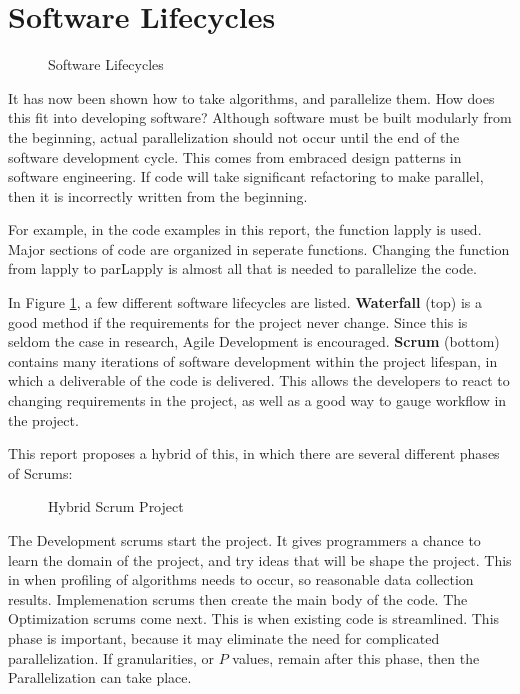 
\section{Software Lifecycles}

\begin{figure}[h]
	\begin{center}
		\caption{Software Lifecycles} 
		\label{lifecycles}
	\end{center}
\end{figure}

It has now been shown how to take algorithms, and parallelize them. How does this fit into developing software?
Although software must be built modularly from the beginning, actual parallelization should not occur until the 
end of the software development cycle. This comes from embraced design patterns in software engineering.
If code will take significant refactoring to make parallel, then it is incorrectly written from the beginning.

For example, in the code examples in this report, the function lapply is used. Major sections of code are organized in seperate functions. Changing the function from lapply to parLapply is almost all that is needed
to parallelize the code. 

In Figure \ref{lifecycles}, a few different software lifecycles are listed. \textbf{Waterfall} (top) is a good method if
the requirements for the project never change. Since this is seldom the case in research, Agile 
Development is encouraged. \textbf{Scrum} (bottom) contains many iterations of software development within
the project lifespan, in which a deliverable of the code is delivered. This allows the developers to react to 
changing requirements in the project, as well as a good way to gauge workflow in the project.

This report proposes a hybrid of this, in which there are several different phases of Scrums:

\begin{figure}[h]
	\begin{center}
		\caption{Hybrid Scrum Project} 
		\label{hybrid_scrums}
	\end{center}
\end{figure}

The Development scrums start the project. It gives programmers a chance to learn the domain of the project, and try ideas that will be shape the project. This in when profiling of algorithms needs to occur, so reasonable 
data collection results. Implemenation scrums then create the main body of the code. The 
Optimization scrums come next. This is when existing code is streamlined. This phase is important, because it may eliminate the need for complicated parallelization. If granularities, or $P$ values, remain after this 
phase, then the Parallelization can take place.
